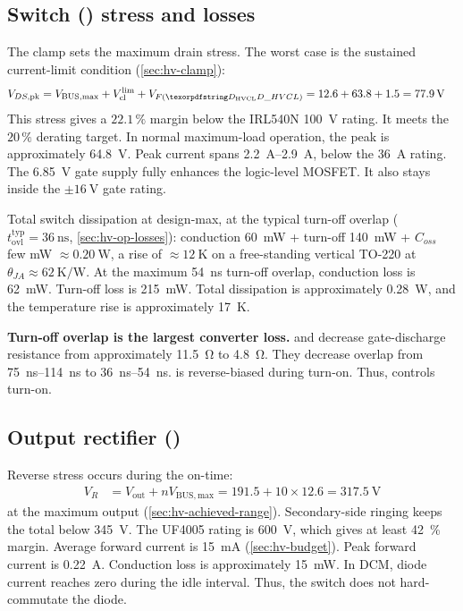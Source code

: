\subsection{Switch () stress and losses}\label{sec:hv-switch}

The clamp sets the maximum drain stress. The worst case is the sustained
current-limit condition (\cref{sec:hv-clamp}):
\begin{align*}
  V_{DS,\mathrm{pk}} &= V_{\mathrm{BUS,max}} + V_{\mathrm{cl}}^{\mathrm{lim}}
    + V_{F(\des{D}{HVCL})} = 12.6 + 63.8 + 1.5 = \SI{77.9}{\volt}
\end{align*}
This stress gives a $22.1\,\%$ margin below the IRL540N
\SI{100}{\volt} rating. It meets the $20\,\%$ derating target. In normal
maximum-load operation, the peak is approximately \SI{64.8}{\volt}. Peak current
spans \SIrange{2.2}{2.9}{\ampere}, below the \SI{36}{\ampere} rating. The
\SI{6.85}{\volt} gate supply fully enhances the logic-level MOSFET. It also
stays inside the $\pm\SI{16}{\volt}$ gate rating.

Total switch dissipation at design-max, at the typical turn-off overlap
($t_{\mathrm{ovl}}^{\mathrm{typ}}=\SI{36}{\nano\second}$, \cref{sec:hv-op-losses}):
conduction \SI{60}{\milli\watt} + turn-off \SI{140}{\milli\watt} + $C_{oss}$ few
\si{\milli\watt} $\approx \SI{0.20}{\watt}$, a rise of $\approx\SI{12}{\kelvin}$
on a free-standing vertical TO-220 at $\theta_{JA} \approx
\SI{62}{\kelvin\per\watt}$. At the maximum \SI{54}{\nano\second} turn-off
overlap, conduction loss is \SI{62}{\milli\watt}. Turn-off loss is
\SI{215}{\milli\watt}. Total dissipation is approximately
\SI{0.28}{\watt}, and the temperature rise is approximately
\SI{17}{\kelvin}.

\textbf{Turn-off overlap is the largest converter loss.}
 and  decrease gate-discharge resistance from
approximately \SI{11.5}{\ohm} to \SI{4.8}{\ohm}. They decrease overlap from
\SIrange{75}{114}{\nano\second} to
\SIrange{36}{54}{\nano\second}.  is reverse-biased during
turn-on. Thus,  controls turn-on.

\subsection{Output rectifier ()}\label{sec:hv-rect}

Reverse stress occurs during the on-time:
\begin{align*}
  V_R &= V_{\mathrm{out}} + n V_{\mathrm{BUS,max}}
       = 191.5 + 10 \times 12.6 = \SI{317.5}{\volt}
\end{align*}
at the maximum output (\cref{sec:hv-achieved-range}). Secondary-side ringing
keeps the total below \SI{345}{\volt}. The UF4005 rating is
\SI{600}{\volt}, which gives at least \SI{42}{\percent} margin. Average forward
current is \SI{15}{\milli\ampere} (\cref{sec:hv-budget}). Peak forward current
is \SI{0.22}{\ampere}. Conduction loss is approximately
\SI{15}{\milli\watt}. In DCM, diode current reaches zero during the idle
interval. Thus, the switch does not hard-commutate the diode.

